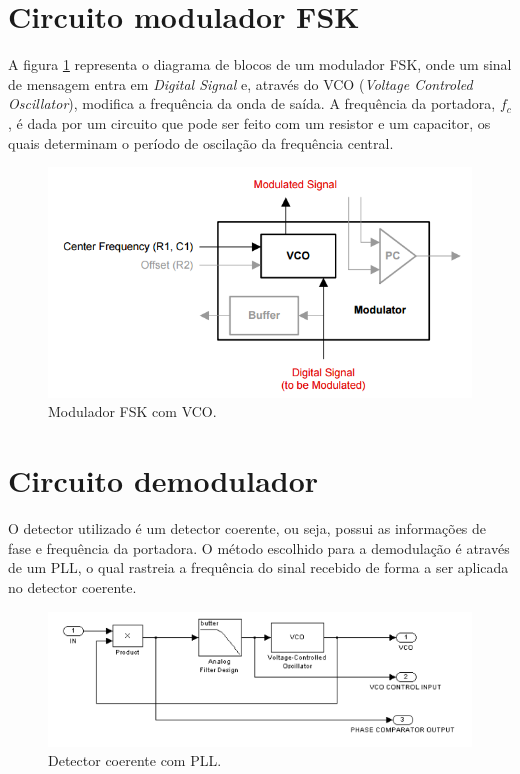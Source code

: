\documentclass[12pt,a4paper]{article}%
\begin{document}
\section{Circuito modulador FSK}

A figura \ref{fig:modulador} representa o diagrama de blocos de um modulador FSK, onde um sinal de mensagem entra em \textit{Digital Signal} e, através do VCO (\textit{Voltage Controled Oscillator}), modifica a frequência da onda de saída. A frequência da portadora, $f_c$, é dada por um circuito que pode ser feito com um resistor e um capacitor, os quais determinam o período de oscilação da frequência central.

\begin{figure}[H]
    \centering
    \includegraphics[scale=0.5]{imagem/modulador}
    \caption{Modulador FSK com VCO.}
    \label{fig:modulador}
\end{figure}
\section{Circuito demodulador}

O detector utilizado é um detector coerente, ou seja, possui as informações de fase e frequência da portadora. O método escolhido para a demodulação é através de um PLL, o qual rastreia a frequência do sinal recebido de forma a ser aplicada no detector coerente.



\begin{figure}[H]
    \centering
    \includegraphics[scale=0.5]{imagem/coerente}
    \caption{Detector coerente com PLL.}
    \label{fig:detector}
\end{figure}
\end{document}
